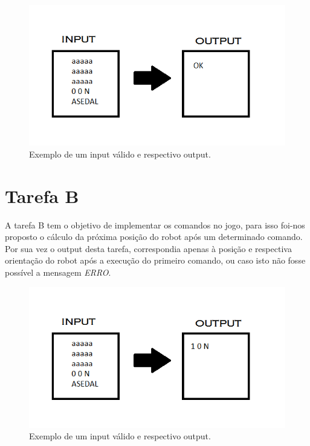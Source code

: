 \documentclass[a4paper,12pt]{report}
\begin{document}
\begin{figure}[!h]
\centering
\includegraphics[scale=0.45]{./RELATORIOEX2.png}
\caption{Exemplo de um input válido e respectivo output.}
\end{figure}

\section{Tarefa B}
A tarefa B tem o objetivo de implementar os comandos no jogo, para isso foi-nos proposto o cálculo da próxima posição do robot após um determinado comando. Por sua vez o output desta tarefa, correspondia apenas à posição e respectiva orientação do robot após a execução do primeiro comando, ou caso isto não fosse possível a mensagem \emph{ERRO}. 

\begin{figure}[!h]
\centering
\includegraphics[scale=0.45]{./RELATORIOEX3.png}
\caption{Exemplo de um input válido e respectivo output.}
\end{figure}
\end{document}
